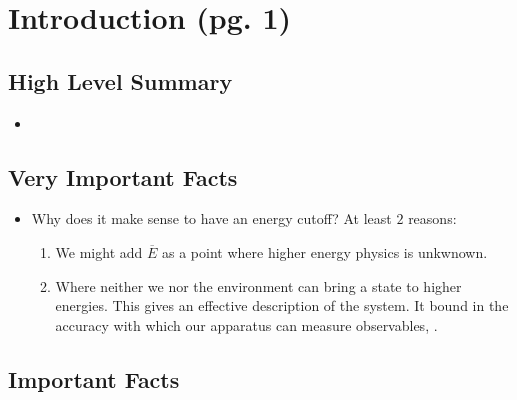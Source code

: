 \documentclass{article}
\newcommand{\cut}[1]{\overline{#1}}
\begin{document}
\section{Introduction (pg. 1)}

\subsection*{High Level Summary}

    \begin{itemize}

    \item 
    
    \end{itemize}

\subsection*{Very Important Facts}

    \begin{itemize}

    \item Why does it make sense to have an energy cutoff? At least $2$ reasons:
    
        \begin{enumerate}
            
        \item We might add $\cut E$ as a point where higher energy physics is unkwnown.
        
        \item Where neither we nor the environment can bring a state to higher energies. This gives an effective description of the system. It  bound in the accuracy with which our apparatus can measure observables, .
            
        \end{enumerate}
    
    \end{itemize}

\subsection*{Important Facts}
\end{document}
